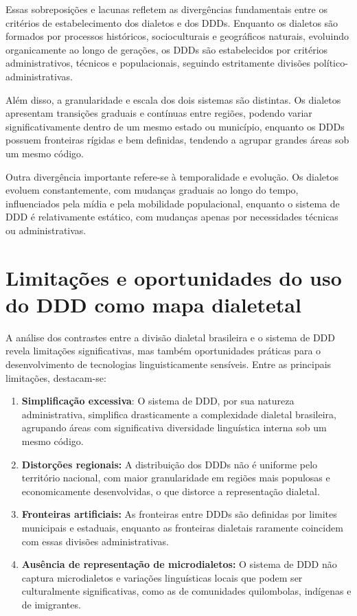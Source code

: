 Essas sobreposições e lacunas refletem as divergências fundamentais entre os critérios de estabelecimento dos dialetos e dos DDDs. Enquanto os dialetos são formados por processos históricos, socioculturais e geográficos naturais, evoluindo organicamente ao longo de gerações, os DDDs são estabelecidos por critérios administrativos, técnicos e populacionais, seguindo estritamente divisões político-administrativas.

Além disso, a granularidade e escala dos dois sistemas são distintas. Os dialetos apresentam transições graduais e contínuas entre regiões, podendo variar significativamente dentro de um mesmo estado ou município, enquanto os DDDs possuem fronteiras rígidas e bem definidas, tendendo a agrupar grandes áreas sob um mesmo código.


Outra divergência importante refere-se à temporalidade e evolução. Os dialetos evoluem constantemente, com mudanças graduais ao longo do tempo, influenciados pela mídia e pela mobilidade populacional, enquanto o sistema de DDD é relativamente estático, com mudanças apenas por necessidades técnicas ou administrativas.


\section{Limitações e oportunidades do uso do DDD como mapa dialetetal}
A análise dos contrastes entre a divisão dialetal brasileira e o sistema de DDD revela limitações significativas, mas também oportunidades práticas para o desenvolvimento de tecnologias linguisticamente sensíveis. Entre as principais limitações, destacam-se:
\begin{enumerate}
    \item \textbf{Simplificação excessiva}: O sistema de DDD, por sua natureza administrativa, simplifica drasticamente a complexidade dialetal brasileira, agrupando áreas com significativa diversidade linguística interna sob um mesmo código.
    \item \textbf{Distorções regionais:} A distribuição dos DDDs não é uniforme pelo território nacional, com maior granularidade em regiões mais populosas e economicamente desenvolvidas, o que distorce a representação dialetal.
    \item \textbf{Fronteiras artificiais:} As fronteiras entre DDDs são definidas por limites municipais e estaduais, enquanto as fronteiras dialetais raramente coincidem com essas divisões administrativas.
    \item \textbf{Ausência de representação de microdialetos:} O sistema de DDD não captura microdialetos e variações linguísticas locais que podem ser culturalmente significativas, como as de comunidades quilombolas, indígenas e de imigrantes.
\end{enumerate}

